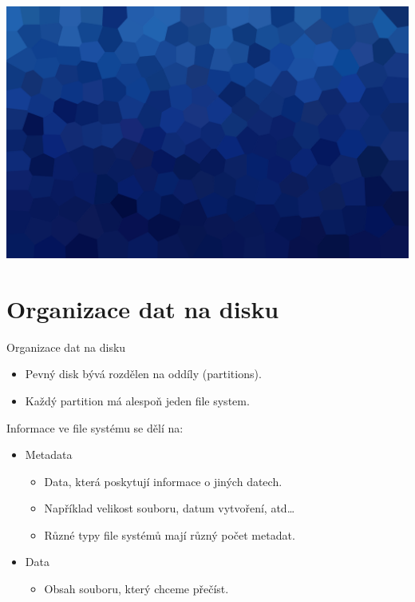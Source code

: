 \documentclass[aspectratio=169,xcolor=dvipsnames, t]{beamer}
\begin{document}
{
{
    \includegraphics[width=\paperwidth,height=\paperheight]{AICStyleData/logos/mene_polygonu_bg.png}
}
\section{Organizace dat na disku}
\begin{frame}{Organizace dat na disku}
\begin{itemize}
    \item Pevný disk bývá rozdělen na oddíly (partitions).
    \item Každý partition má alespoň jeden file system. 
\end{itemize}
Informace ve file systému se dělí na:
\begin{itemize}
    \item Metadata
    \begin{itemize}
        \item Data, která poskytují informace o jiných datech.
        \item Například velikost souboru, datum vytvoření, atd\dots
        \item Různé typy file systémů mají různý počet metadat.
    \end{itemize}
    \item Data
    \begin{itemize}
        \item Obsah souboru, který chceme přečíst.
    \end{itemize}
\end{itemize}
    
\end{frame}
}







\makefinalpage
\end{document}

